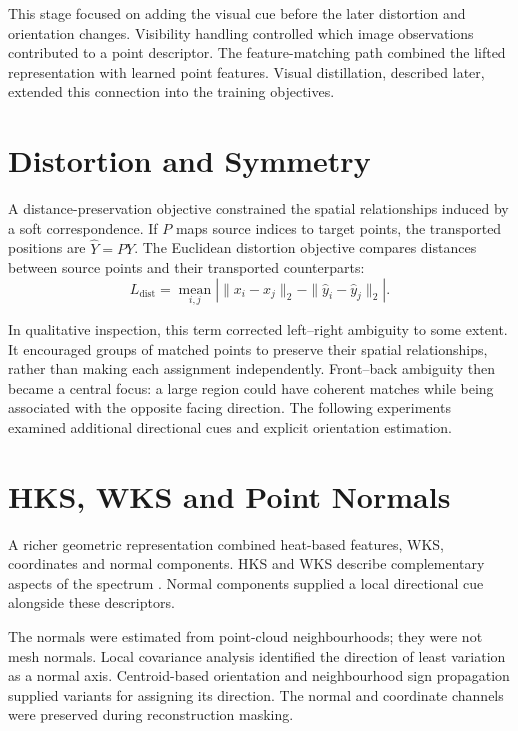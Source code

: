 This stage focused on adding the visual cue before the later distortion and orientation changes. Visibility handling controlled which image observations contributed to a point descriptor. The feature-matching path combined the lifted representation with learned point features. Visual distillation, described later, extended this connection into the training objectives.

\section{Distortion and Symmetry}
\label{app:distortion}
A distance-preservation objective constrained the spatial relationships induced by a soft correspondence. If $P$ maps source indices to target points, the transported positions are $\widehat Y=PY$. The Euclidean distortion objective compares distances between source points and their transported counterparts:
\begin{equation}
 L_{\mathrm{dist}}=\underset{i,j}{\operatorname{mean}}
 \left|\|x_i-x_j\|_2-\|\widehat y_i-\widehat y_j\|_2\right|.
\end{equation}

In qualitative inspection, this term corrected left--right ambiguity to some extent. It encouraged groups of matched points to preserve their spatial relationships, rather than making each assignment independently. Front--back ambiguity then became a central focus: a large region could have coherent matches while being associated with the opposite facing direction. The following experiments examined additional directional cues and explicit orientation estimation.

\section{HKS, WKS and Point Normals}
\label{app:descriptors}
A richer geometric representation combined heat-based features, WKS, coordinates and normal components. HKS and WKS describe complementary aspects of the spectrum \citep{10.5555/1735603.1735621,Aubry_2011_WKS}. Normal components supplied a local directional cue alongside these descriptors.

The normals were estimated from point-cloud neighbourhoods; they were not mesh normals. Local covariance analysis identified the direction of least variation as a normal axis. Centroid-based orientation and neighbourhood sign propagation supplied variants for assigning its direction. The normal and coordinate channels were preserved during reconstruction masking.

